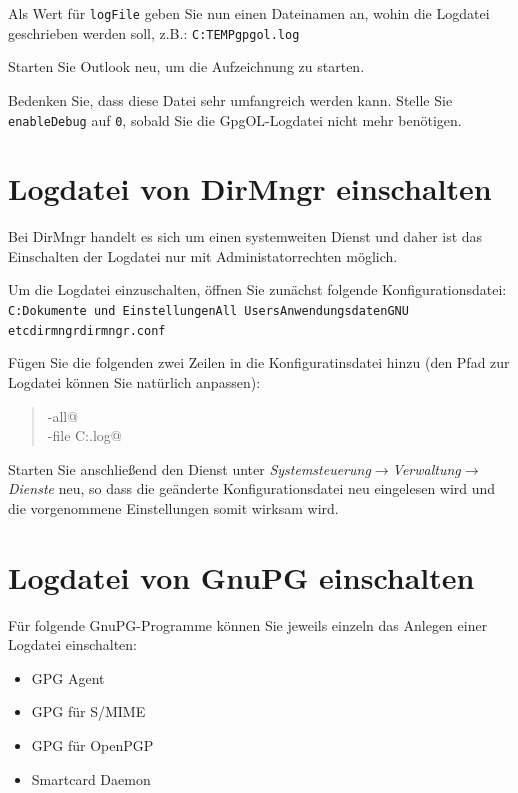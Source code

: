 \documentclass[a4paper,11pt, oneside,openright,titlepage,dvips]{scrbook}
\newcommand{\Menu}[1]{\emph{#1}}
\newcommand{\Filename}[1]{\texttt{#1}}
\newcounter{chapter}
\newcounter{section}[chapter]
\begin{document}


Als Wert für \Filename{logFile} geben Sie nun einen Dateinamen an,
wohin die Logdatei geschrieben werden soll, z.B.:
\Filename{C:\back{}TEMP\back{}gpgol.log}


Starten Sie Outlook neu, um die Aufzeichnung zu starten.

Bedenken Sie, dass diese Datei sehr umfangreich werden kann.
Stelle Sie \Filename{enableDebug} auf
\Filename{0}, sobald Sie die GpgOL-Logdatei nicht mehr benötigen.


\section{Logdatei von DirMngr einschalten}

Bei DirMngr handelt es sich um einen systemweiten Dienst und daher
ist das Einschalten der Logdatei nur mit Administatorrechten
möglich.

Um die Logdatei einzuschalten, öffnen Sie zunächst folgende
Konfigurationsdatei:
\Filename{C:\back{}Dokumente und Einstellungen\back{}All
Users\back{}Anwendungsdaten\back{}GNU\back{}\\
etc\back{}dirmngr\back{}dirmngr.conf}

Fügen Sie die folgenden zwei Zeilen in die Konfiguratinsdatei hinzu
(den Pfad zur Logdatei können Sie natürlich anpassen):

\begin{quote}
       \verb@debug-all@ \\
       \verb@log-file C:\TEMP\dirmngr.log@
\end{quote}

Starten Sie anschließend den Dienst unter
\Menu{Systemsteuerung$\rightarrow$Verwaltung$\rightarrow$Dienste} neu,
so dass die geänderte Konfigurationsdatei neu eingelesen wird und die
vorgenommene Einstellungen somit wirksam wird.

\clearpage
\section{Logdatei von GnuPG einschalten}

Für folgende GnuPG-Programme können Sie jeweils einzeln das Anlegen
einer Logdatei einschalten:
\begin{itemize}
    \item GPG Agent
    \item GPG für S/MIME
    \item GPG für OpenPGP
    \item Smartcard Daemon
\end{itemize}
\end{document}

